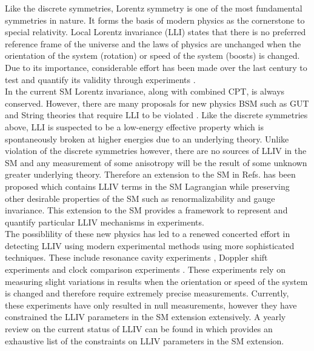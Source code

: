 \documentclass[10pt,a4paper, twoside, openright]{report}
\begin{document}
Like the discrete symmetries, Lorentz symmetry is one of the most fundamental symmetries in nature. It forms the basis of modern physics as the cornerstone to special relativity. Local Lorentz invariance (LLI) states that there is no preferred reference frame of the universe and the laws of physics are unchanged when the orientation of the system (rotation) or speed of the system (boosts) is changed. Due to its importance, considerable effort has been made over the last century to test and quantify its validity through experiments \cite{Michelson1887, Kennedy1932, Ives1938, Robertson1949, LorentzTestSeries}.  \\
\linebreak
In the current SM Lorentz invariance, along with combined CPT, is always conserved. However, there are many proposals for new physics BSM such as GUT and String theories that require LLI to be violated \cite{Kostelecky1989,  Damour, Gambini1999, Pospelov2012, Kostelecky1995, Mavromatos2007, Liberati2013}.  Like the discrete symmetries above, LLI is suspected to be a low-energy effective property which is spontaneously broken at higher energies due to an underlying theory. Unlike violation of the discrete symmetries however,  there  are no sources of LLIV in the SM and any measurement of some anisotropy will be the result of some unknown greater underlying theory. Therefore an extension to the SM in Refs. \cite{Colladay1997, Colladay1998, Kostelecky1999, LorentzDataTables2017} has been proposed which contains LLIV terms in the SM Lagrangian while preserving other desirable properties of the SM such as renormalizability and gauge invariance. This extension to the SM provides a framework to represent and quantify particular LLIV mechanisms in experiments. \\
\linebreak
The possiblility of these new physics has led to a renewed concerted effort in detecting LLIV using modern experimental methods using more sophisticated techniques. These include  resonance cavity experiments \cite{Muller2005, Muller2003, Wolf2004}, Doppler shift experiments \cite{Lane2005, Saathoff2003} and clock comparison experiments \cite{Prestage1985, Chupp1989, Hohensee2013, Dzuba2016}. These experiments rely on measuring slight variations in results when the orientation or speed of the system is changed and therefore require extremely precise measurements. Currently, these experiments have only resulted in null measurements, however they have constrained the LLIV parameters in the SM extension extensively. A yearly review on the current status of LLIV can be found in \cite{LorentzDataTables2019} which provides an exhaustive list of the constraints on LLIV parameters in the SM extension.\\
\end{document}
